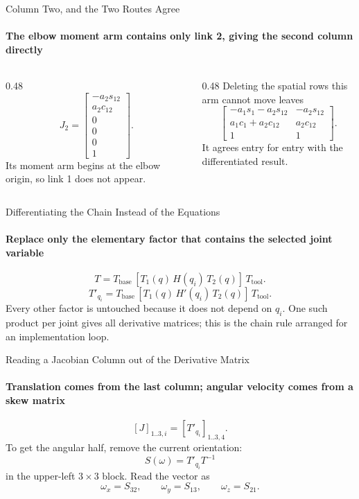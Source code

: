 \documentclass[aspectratio=169]{beamer}
\begin{document}
\begin{frame}[t]{Column Two, and the Two Routes Agree}
    \framesubtitle{The elbow moment arm contains only link 2, giving the second column directly}
    \begin{columns}[T,onlytextwidth]
        \begin{column}{0.48\textwidth}
            \[
                J_2=
                \begin{bmatrix}
                    -a_2s_{12}\\a_2c_{12}\\0\\0\\0\\1
                \end{bmatrix}.
            \]
            Its moment arm begins at the elbow origin, so link 1 does not appear.
        \end{column}
        \begin{column}{0.48\textwidth}
            Deleting the spatial rows this arm cannot move leaves
            \[
                \begin{bmatrix}
                    -a_1s_1-a_2s_{12}&-a_2s_{12}\\
                    a_1c_1+a_2c_{12}&a_2c_{12}\\
                    1&1
                \end{bmatrix}.
            \]
            It agrees entry for entry with the differentiated result.
        \end{column}
    \end{columns}
\end{frame}

\begin{frame}[t]{Differentiating the Chain Instead of the Equations}
    \framesubtitle{Replace only the elementary factor that contains the selected joint variable}
    \[
        T=T_{\mathrm{base}}\,[T_1(q)\,H(q_i)\,T_2(q)]\,T_{\mathrm{tool}}.
    \]
    \[
        T'_{q_i}=T_{\mathrm{base}}\,[T_1(q)\,H'(q_i)\,T_2(q)]\,T_{\mathrm{tool}}.
    \]
    Every other factor is untouched because it does not depend on $q_i$. One such product per joint gives all derivative matrices; this is the chain rule arranged for an implementation loop.
\end{frame}

\begin{frame}[t]{Reading a Jacobian Column out of the Derivative Matrix}
    \framesubtitle{Translation comes from the last column; angular velocity comes from a skew matrix}
    \[
        [J]_{1..3,i}=[T'_{q_i}]_{1..3,4}.
    \]
    To get the angular half, remove the current orientation:
    \[
        S(\omega)=T'_{q_i}T^{-1}
    \]
    in the upper-left $3\times3$ block. Read the vector as
    \[
        \omega_x=S_{32},\qquad\omega_y=S_{13},\qquad\omega_z=S_{21}.
    \]
\end{frame}
\end{document}
